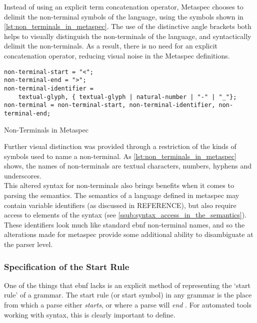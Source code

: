Instead of using an explicit term concatenation operator, Metaspec chooses to delimit the non-terminal symbols of the language, using the symbols shown in \autoref{lst:non_terminals_in_metaspec}.
The use of the distinctive angle brackets both helps to visually distinguish the non-terminals of the language, and syntactically delimit the non-terminals.
As a result, there is no need for an explicit concatenation operator, reducing visual noise in the Metaspec definitions.

\begin{listing}[!htb]
\begin{verbatim}
non-terminal-start = "<";
non-terminal-end = ">";
non-terminal-identifier = 
    textual-glyph, { textual-glyph | natural-number | "-" | "_"};
non-terminal = non-terminal-start, non-terminal-identifier, non-terminal-end;
\end{verbatim}
\caption{Non-Terminals in Metaspec}
\label{lst:non_terminals_in_metaspec}
\end{listing}

Further visual distinction was provided through a restriction of the kinds of symbols used to name a non-terminal.
As \autoref{lst:non_terminals_in_metaspec} shows, the names of non-terminals are textual characters, numbers, hyphens and underscores. \\

This altered syntax for non-terminals also brings benefits when it comes to parsing the semantics. 
The semantics of a language defined in metaspec may contain variable identifiers (as discussed in REFERENCE), but also require access to elements of the syntax (see \autoref{ssub:syntax_access_in_the_semantics}).
These identifiers look much like standard \gls{ebnf} non-terminal names, and so the alterations made for \gls{metaspec} provide some additional ability to disambiguate at the parser level. 


\subsubsection{Specification of the Start Rule} %
\label{ssub:specification_of_the_start_rule}
One of the things that \gls{ebnf} lacks is an explicit method of representing the `start rule' of a grammar. 
The start rule (or start symbol) in any grammar is the place from which a parse either \textit{starts}, or where a parse will \textit{end} \cite{slonneger1995formal}.
For automated tools working with syntax, this is clearly important to define. \\

